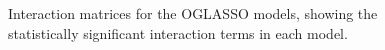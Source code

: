 \begin{figure}[h!]
\caption{Interaction matrices for the OGLASSO models, showing the statistically significant interaction terms in each model.}\label{interactions}
\end{figure}

